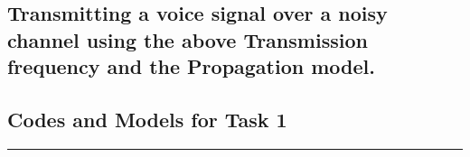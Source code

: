 \documentclass[a4paper,11pt]{article}%
\begin{document}
\subsection{Transmitting a voice signal over a noisy channel using the above Transmission frequency and the Propagation model.}





\pagebreak
\subsection{Codes and Models for Task 1}





\vfill
\hrule



\end{document}
